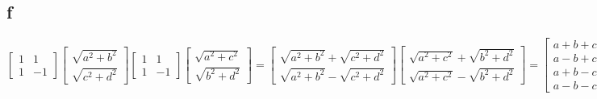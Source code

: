\documentclass[letterpaper,notitlepage,twoside]{article}
\begin{document}
\subsection*{f}
$\begin{bmatrix}
1 &  1 \\
1 & -1
\end{bmatrix}
\begin{bmatrix}
\sqrt{a^2 + b^2} \\
\sqrt{c^2 + d^2}
\end{bmatrix}
\begin{bmatrix}
1 &  1 \\
1 & -1
\end{bmatrix}
\begin{bmatrix}
\sqrt{a^2 + c^2} \\
\sqrt{b^2 + d^2}
\end{bmatrix}
=
\begin{bmatrix}
\sqrt{a^2 + b^2} + \sqrt{c^2 + d^2}\\
\sqrt{a^2 + b^2} - \sqrt{c^2 + d^2}
\end{bmatrix}
\begin{bmatrix}
\sqrt{a^2 + c^2} + \sqrt{b^2 + d^2} \\
\sqrt{a^2 + c^2} - \sqrt{b^2 + d^2}
\end{bmatrix}
=
\begin{bmatrix}
a + b + c + d \\
a - b + c - d \\
a + b - c - d \\
a - b - c + d
\end{bmatrix}
$
\end{document}
